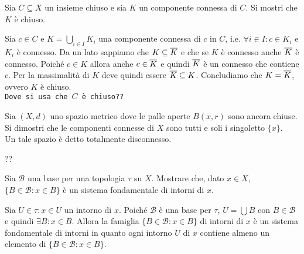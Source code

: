 \begin{es}
  Sia $ C \subseteq X $ un insieme chiuso e sia $ K $ un componente connessa di $ C $. Si mostri che $ K $ è chiuso.
\end{es}
%
Sia $ c \in C $ e $ K = \bigcup_{i \in I} K_i $ una componente connessa di $ c $ in $ C $, i.e. $ \forall i \in I : c \in K_i $ e $ K_i $ è connesso. Da un lato sappiamo che $ K \subseteq \overline{K} $ e che se $ K $ è connesso anche $ \overline{K} $ è connesso. Poiché $ c \in K $ allora anche $ c \in \overline{K} $ e quindi $ \overline{K} $ è un connesso che contiene $ c $. Per la massimalità di $ K $ deve quindi essere $ \overline{K} \subseteq K $. Concludiamo che $ K = \overline{K} $, ovvero $ K $ è chiuso. \\
\texttt{Dove si usa che $ C $ è chiuso??}

\begin{es}
  Sia $ (X, d) $ uno spazio metrico dove le palle aperte $ B(x, r) $ sono ancora chiuse. Si dimostri che le componenti connesse di $ X $ sono tutti e soli i singoletto $ \{x\} $. \\
  Un tale spazio è detto totalmente disconnesso.
\end{es}
%
??

\begin{es}
  Sia $ \mathcal{B} $ una base per una topologia $ \tau $ su $ X $. Mostrare che, dato $ x \in X $, $ \{B \in \mathcal{B} : x \in B\} $ è un sistema fondamentale di intorni di $ x $.
\end{es}
%
Sia $ U \in \tau : x \in U $ un intorno di $ x $. Poiché $ \mathcal{B} $ è una base per $ \tau $, $ U = \bigcup B $ con $ B \in \mathcal{B} $ e quindi $ \exists B : x \in B $. Allora la famiglia $ \{B \in \mathcal{B} : x \in B\} $ di intorni di $ x $ è un sistema fondamentale di intorni in quanto ogni intorno $ U $ di $ x $ contiene almeno un elemento di $ \{B \in \mathcal{B} : x \in B\} $.

